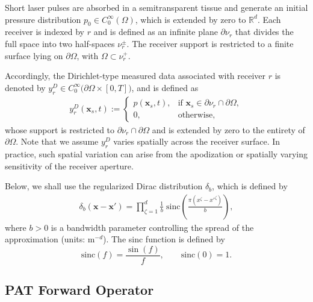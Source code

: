 \documentclass[11pt,reqno]{amsart}
\theoremstyle{remark}
\newcommand{\bx}{\boldsymbol{x}}
\begin{document}
Short laser pulses are absorbed in a semitransparent tissue and generate an initial pressure distribution $p_0 \in C_0^\infty(\Omega)$, which is extended by zero to $\mathbb{R}^d$. Each receiver is indexed by $r$ and is defined as an infinite plane $\partial \nu_r$ that divides the full space into two half-spaces $\nu_r^{\pm}$. The receiver support is restricted to a finite surface lying on $\partial \Omega$, with $\Omega \subset \nu_r^{+}$.


Accordingly, the Dirichlet-type measured data associated with receiver \( r \) is denoted by \( y_r^D \in C_0^{\infty} \big( \partial \Omega \times [0,T] \big) \), and is defined as
    \begin{align} \label{eq:dirichlet-data}
        y_r^D(\bx_s, t) := 
        \begin{cases}
            \displaystyle p(\bx_s, t), & \text{if }\bx_s \in \partial \nu_r \cap \partial \Omega , \\[0.5em]
            0, & \text{otherwise},
        \end{cases}
    \end{align}
whose support is restricted to $\partial \nu_r \cap \partial \Omega$ and is extended by zero to the entirety of $\partial \Omega$. Note that we assume $y_r^D$ varies spatially across the receiver surface. In practice, such spatial variation can arise from the apodization or spatially varying sensitivity of the receiver aperture.

Below, we shall use the regularized Dirac distribution \(\delta_b\), which is defined by
\begin{align} \label{eq:delta-regularized}
\delta_b(\bx - \bx') 
= \prod_{\zeta=1}^d \frac{1}{b} \;
\mathrm{sinc}\!\left( \frac{\pi (x^\zeta - x'^\zeta)}{b} \right),
\end{align}
where \(b>0\) is a bandwidth parameter controlling the spread of the approximation (units: \(\mathrm{m}^{-d}\)). 
The sinc function is defined by
\[
\mathrm{sinc}(f) = \frac{\sin(f)}{f}, 
\qquad \mathrm{sinc}(0) = 1.
\]



\subsection{PAT Forward Operator}  \label{sec:pat-forward}
\end{document}
